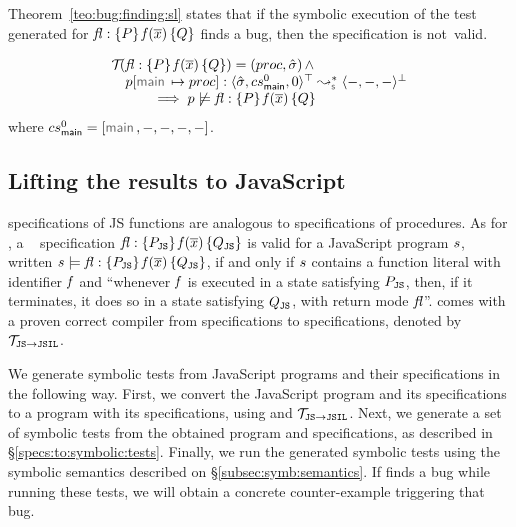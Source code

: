Theorem~\ref{teo:bug:finding:sl} states that if the symbolic execution of the 
test generated for ${\mathit{fl}} : \{ P \} \, \mathit{f}(\overline{x}) \, \{ Q \}$ finds a bug, then the specification 
is not~valid.

\begin{theorem}\label{teo:bug:finding:sl}
$$
\begin{array}{l}
\testify{}(\specsig{\pass}{\pid(\jvec{x})}{\qass}{\flag})  = (\proc, \sstate) \, \wedge \\
\quad
  \prog[\jsilmain \mapsto \proc] :  \transabssemrule{\sstate, \csmain, 0}{-, -, -}{\top}{\bot}{\symbolic} \\ \quad \qquad 
    \implies  
         \prog \not\satisfies \specsig{\pass}{\pid(\jvec{x})}{\qass}{\flag}
\end{array}
$$
\noindent where  $\csmain = [ \jsilmain, -, -, -, - ]$.
\end{theorem}


\subsection{Lifting the results to JavaScript}

\javert specifications of JS functions are analogous to \jsil specifications of \jsil procedures.
As for \jsil, a \javert~\cite{javert} specification ${\mathit{fl}} : \{ P_{\mathtt{JS}} \} \, \mathit{f}(\overline{x}) \, \{ Q_{\mathtt{JS}} \}$
is valid for a JavaScript program $s$, written $s \models {\ensuremath{\mathit{fl}}} : \{ P_{\mathtt{JS}} \} \, \mathit{f}(\overline{x}) \, \{ Q_{\mathtt{JS}} \}$, 
if and only if $s$ contains a function literal with identifier $\mathit{f}$ and ``whenever $\mathit{f}$ is executed in a state satisfying $P_{\mathtt{JS}}$, then, 
if it terminates, it does so in a state satisfying $Q_{\mathtt{JS}}$, with return mode $\mathit{fl}$''. 
\javert comes with a proven correct compiler from \javert specifications to \jsil specifications, denoted by $\mathcal{T}_{\mathtt{JS}\rightarrow\mathtt{JSIL}}$. 

We generate symbolic tests from JavaScript programs and their \javert specifications in the following way. 
First, we convert the JavaScript program and its \javert specifications to a \jsil program with its \jsil specifications, 
using \jstojsil and $\mathcal{T}_{\mathtt{JS}\rightarrow\mathtt{JSIL}}$. Next, we generate a set of symbolic tests from the obtained 
\jsil program and \jsil specifications, as described in \S\ref{specs:to:symbolic:tests}. 
Finally, we run the generated \jsil symbolic tests using the \jsil symbolic semantics described on \S\ref{subsec:symb:semantics}. 
If \cosette finds a bug while running these tests, we will obtain a concrete counter-example triggering that bug.

